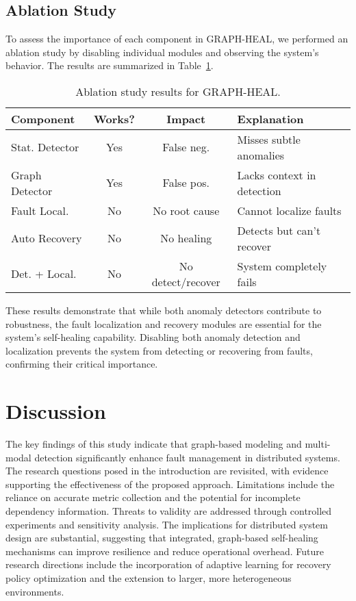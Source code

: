 \documentclass[11pt,twocolumn]{article}
\begin{document}
\subsection{Ablation Study}

To assess the importance of each component in GRAPH-HEAL, we performed an ablation study by disabling individual modules and observing the system's behavior. The results are summarized in Table~\ref{tab:ablation}.

\begin{table}[h]
\centering
\footnotesize %
\setlength{\tabcolsep}{3pt} %
\begin{tabular}{lccp{2.5cm}}
\toprule
\textbf{Component} & \textbf{Works?} & \textbf{Impact} & \textbf{Explanation} \\\midrule
Stat. Detector    & Yes & False neg. & Misses subtle anomalies \\
Graph Detector    & Yes & False pos. & Lacks context in detection \\
Fault Local.      & No  & No root cause & Cannot localize faults \\
Auto Recovery     & No  & No healing & Detects but can't recover \\
Det. + Local.     & No  & No detect/recover & System completely fails \\
\bottomrule
\end{tabular}
\caption{Ablation study results for GRAPH-HEAL.}
\label{tab:ablation}
\end{table}

These results demonstrate that while both anomaly detectors contribute to robustness, the fault localization and recovery modules are essential for the system's self-healing capability. Disabling both anomaly detection and localization prevents the system from detecting or recovering from faults, confirming their critical importance.


\section{Discussion}
The key findings of this study indicate that graph-based modeling and multi-modal detection significantly enhance fault management in distributed systems. The research questions posed in the introduction are revisited, with evidence supporting the effectiveness of the proposed approach. Limitations include the reliance on accurate metric collection and the potential for incomplete dependency information. Threats to validity are addressed through controlled experiments and sensitivity analysis. The implications for distributed system design are substantial, suggesting that integrated, graph-based self-healing mechanisms can improve resilience and reduce operational overhead. Future research directions include the incorporation of adaptive learning for recovery policy optimization and the extension to larger, more heterogeneous environments.
\end{document}
